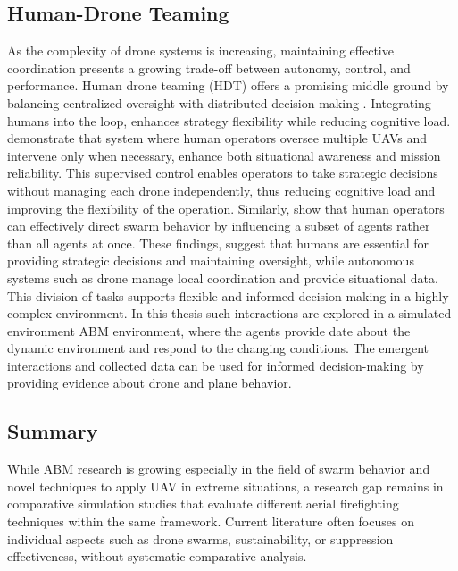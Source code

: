 \documentclass[11pt, a4paper]{article}
\begin{document}
\subsection{Human-Drone Teaming}

As the complexity of drone systems is increasing, maintaining effective coordination presents a growing trade-off between autonomy, control, and performance. Human drone teaming (HDT) offers a promising middle ground by balancing centralized oversight with distributed decision-making \citep{asavasirikulkij2023human_Workload}. Integrating humans into the loop, enhances strategy flexibility while reducing cognitive load. \citet{SAT_first} demonstrate that system where human operators oversee multiple UAVs and intervene only when necessary, enhance both situational awareness and mission reliability. This supervised control enables operators to take strategic decisions without managing each drone independently, thus reducing cognitive load and improving the flexibility of the operation. Similarly, \citet*{lewisHumanFactorsIssues2012} show that human operators can effectively direct swarm behavior by influencing a subset of agents rather than all agents at once.
These findings, suggest that humans are essential for providing strategic decisions and maintaining oversight, while autonomous systems such as drone manage local coordination and provide situational data. This division of tasks supports flexible and informed decision-making in a highly complex environment.
In this thesis such interactions are explored in a simulated environment ABM environment, where the agents provide date about the dynamic environment and respond to the changing conditions. The emergent interactions and collected data can be used for informed decision-making by providing evidence about drone and plane behavior.

\subsection{Summary}

While ABM research is growing especially in the field of swarm behavior and novel techniques to apply UAV in extreme situations, a research gap remains in comparative simulation studies that evaluate different aerial firefighting techniques within the same framework. Current literature often focuses on individual aspects such as drone swarms, sustainability, or suppression effectiveness, without systematic comparative analysis.
\end{document}
